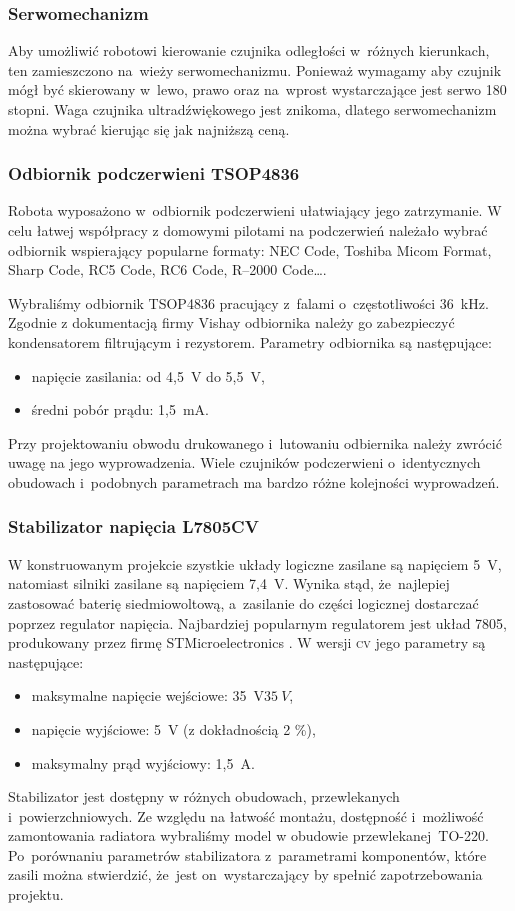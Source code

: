 \documentclass[11pt]{article}
\begin{document}
\subsubsection{Serwomechanizm}
Aby umożliwić robotowi kierowanie czujnika odległości w~różnych kierunkach, ten zamieszczono na~wieży serwomechanizmu.
Ponieważ wymagamy aby czujnik mógł być skierowany w~lewo, prawo oraz na~wprost wystarczające jest serwo 180 stopni.
Waga czujnika ultradźwiękowego jest znikoma, dlatego serwomechanizm można wybrać kierując się jak najniższą ceną.

\subsubsection{Odbiornik podczerwieni TSOP4836}
Robota wyposażono w~odbiornik podczerwieni ułatwiający jego zatrzymanie.
W celu łatwej współpracy z domowymi pilotami na podczerwień należało wybrać odbiornik wspierający popularne formaty: NEC Code, Toshiba Micom Format, Sharp Code, RC5 Code, RC6 Code, R–2000 Code\dots.

Wybraliśmy odbiornik TSOP4836 pracujący z~falami o~częstotliwości 36~\si{\kilo\hertz}. Zgodnie z dokumentacją \cite{ir_datasheet} firmy Vishay
 odbiornika należy go zabezpieczyć kondensatorem filtrującym i rezystorem. Parametry odbiornika są następujące:
\begin{itemize}
	\item napięcie zasilania: od 4,5~\si{\volt} do 5,5~\si{\volt},
	\item średni pobór prądu: 1,5~\si{\milli\ampere}.
\end{itemize}
Przy projektowaniu obwodu drukowanego i~lutowaniu odbiernika należy zwrócić uwagę na jego wyprowadzenia.
Wiele czujników podczerwieni o~identycznych obudowach i~podobnych parametrach ma bardzo różne kolejności wyprowadzeń.

\subsubsection{Stabilizator napięcia L7805CV}
W konstruowanym projekcie szystkie układy logiczne zasilane są napięciem 5~\si{\volt}, natomiast silniki zasilane są napięciem  7,4~\si{\volt}.
Wynika stąd, że~najlepiej zastosować baterię siedmiowoltową, a~zasilanie do części logicznej dostarczać poprzez regulator napięcia. Najbardziej popularnym regulatorem jest układ 7805, produkowany przez firmę STMicroelectronics \cite{stab_datasheet}. 
W wersji \textsc{cv} jego parametry są następujące:
\begin{itemize}
	\item maksymalne napięcie wejściowe: 35~\si{\volt}$ 35\ V $,
	\item napięcie wyjściowe: 5~\si{\volt} (z dokładnością 2 \%),
	\item maksymalny prąd wyjściowy: 1,5~\si{\ampere}.
\end{itemize}
Stabilizator jest dostępny w różnych obudowach, przewlekanych i~powierzchniowych. Ze względu na łatwość montażu, dostępność i~możliwość zamontowania radiatora wybraliśmy model w obudowie przewlekanej~TO-220.
Po~porównaniu parametrów stabilizatora z~parametrami komponentów, które zasili można stwierdzić, że~jest on~wystarczający by spełnić zapotrzebowania projektu.
\end{document}
